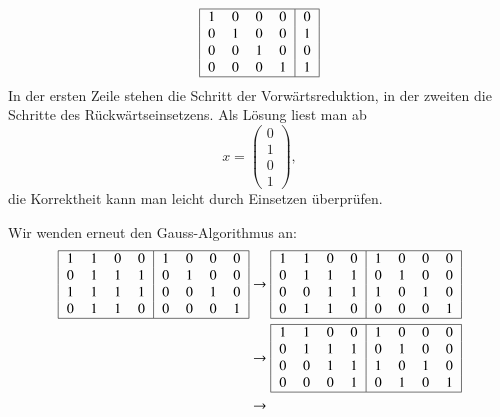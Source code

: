 \begin{loesung}
\begin{teilaufgaben}
\begin{align*}
\begin{tabular}{|>{$}c<{$}>{$}c<{$}>{$}c<{$}>{$}c<{$}|>{$}c<{$}|}
\hline
   1 & 0 & 0 & 0 &  0\\
   0 & 1 & 0 & 0 &  1\\
   0 & 0 & 1 & 0 &  0\\
   0 & 0 & 0 & 1 &  1\\
\hline
\end{tabular}
\end{align*}
In der ersten Zeile stehen die Schritt der Vorwärtsreduktion, in der
zweiten die Schritte des Rückwärtseinsetzens.
Als Lösung liest man ab
\[
x=\begin{pmatrix}0\\1\\0\\1 \end{pmatrix},
\]
die Korrektheit kann man leicht durch Einsetzen überprüfen.
\item
Wir wenden erneut den Gauss-Algorithmus an:
\begin{align*}
\begin{tabular}{|>{$}c<{$}>{$}c<{$}>{$}c<{$}>{$}c<{$}|>{$}c<{$}>{$}c<{$}>{$}c<{$}>{$}c<{$}|}
\hline
   1 & 1 & 0 & 0 &  1 & 0 & 0 & 0 \\
   0 & 1 & 1 & 1 &  0 & 1 & 0 & 0 \\
   1 & 1 & 1 & 1 &  0 & 0 & 1 & 0 \\
   0 & 1 & 1 & 0 &  0 & 0 & 0 & 1 \\
\hline
\end{tabular}
&\to
\begin{tabular}{|>{$}c<{$}>{$}c<{$}>{$}c<{$}>{$}c<{$}|>{$}c<{$}>{$}c<{$}>{$}c<{$}>{$}c<{$}|}
\hline
   1 & 1 & 0 & 0 &  1 & 0 & 0 & 0 \\
   0 & 1 & 1 & 1 &  0 & 1 & 0 & 0 \\
   0 & 0 & 1 & 1 &  1 & 0 & 1 & 0 \\
   0 & 1 & 1 & 0 &  0 & 0 & 0 & 1 \\
\hline
\end{tabular}
\\
&\to
\begin{tabular}{|>{$}c<{$}>{$}c<{$}>{$}c<{$}>{$}c<{$}|>{$}c<{$}>{$}c<{$}>{$}c<{$}>{$}c<{$}|}
\hline
   1 & 1 & 0 & 0 &  1 & 0 & 0 & 0 \\
   0 & 1 & 1 & 1 &  0 & 1 & 0 & 0 \\
   0 & 0 & 1 & 1 &  1 & 0 & 1 & 0 \\
   0 & 0 & 0 & 1 &  0 & 1 & 0 & 1 \\
\hline
\end{tabular}
\\
&\to
\begin{tabular}{|>{$}c<{$}>{$}c<{$}>{$}c<{$}>{$}c<{$}|>{$}c<{$}>{$}c<{$}>{$}c<{$}>{$}c<{$}|}

\end{tabular}
\end{align*}
\end{teilaufgaben}
\end{loesung}
